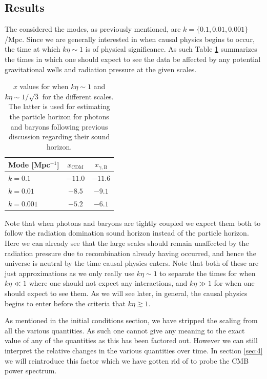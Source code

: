 \documentclass[%
reprint,
 amsmath,amssymb,
 aps,
]{revtex4-2}
\begin{document}
\subsection{Results}
The considered the modes, as previously mentioned, are $k=\{0.1,0.01,0.001\}$/Mpc. Since we are generally interested in when causal physics begins to occur, the time at which $k\eta\sim1$ is of physical significance. As such Table \ref{tab:ketasim1} summarizes the times in which one should expect to see the data be affected by any potential gravitational wells and radiation pressure at the given scales.
\renewcommand{\arraystretch}{1.25}
\begin{table}[ht!]
	\caption{$x$ values for when $k\eta\sim1$ and $k\eta\sim1/\sqrt{3}$ for the different scales. The latter is used for estimating the particle horizon for photons and baryons following previous discussion regarding their sound horizon.}
	\label{tab:ketasim1}
	\begin{tabular}{|l|c|c|}
		\hline
		Mode [Mpc$^{-1}$] & $x_\text{CDM}$ & $x_{\gamma,\text{B}}$      \\\hline
		$k=0.1$                     & $-11.0$ & $-11.6$ \\\hline
		$k=0.01$                   & $-8.5$   & $-9.1$   \\\hline
		$k=0.001$                 & $-5.2$   & $-6.1$   \\\hline
	\end{tabular}
\end{table}
Note that when photons and baryons are tightly coupled we expect them both to follow the radiation domination sound horizon instead of the particle horizon. Here we can already see that the large scales should remain unaffected by the radiation pressure due to recombination already having occurred, and hence the universe is neutral by the time causal physics enters. Note that both of these are just approximations as we only really use $k\eta\sim1$ to separate the times for when $k\eta\ll1$ where one should not expect any interactions, and $k\eta\gg1$ for when one should expect to see them. As we will see later, in general, the causal physics begins to enter before the criteria that $k\eta\gtrsim1$. 

As mentioned in the initial conditions section, we have stripped the scaling from all the various quantities. As such one cannot give any meaning to the exact value of any of the quantities as this has been factored out. However we can still interpret the relative changes in the various quantities over time. In section \ref{sec:4} we will reintroduce this factor which we have gotten rid of to probe the CMB power spectrum.
\end{document}
